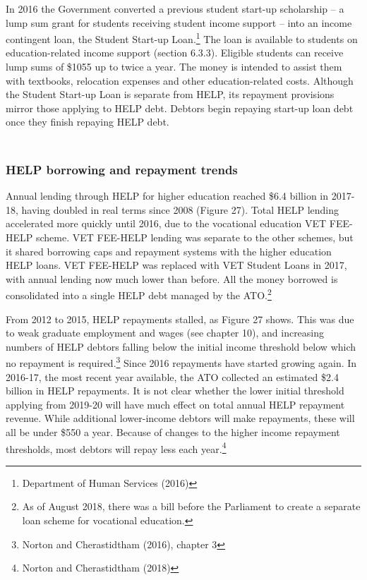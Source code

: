\documentclass[]{book}
\begin{document}
In 2016 the Government converted a previous student start-up scholarship -- a lump sum grant for students receiving student income support -- into an income contingent loan, the Student Start-up Loan.\footnote{Department of Human Services (2016)} The loan is available to students on education-related income support (section 6.3.3). Eligible students can receive lump sums of \$1055 up to twice a year. The money is intended to assist them with textbooks, relocation expenses and other education-related costs. Although the Student Start-up Loan is separate from HELP, its repayment provisions mirror those applying to HELP debt. Debtors begin repaying start-up loan debt once they finish repaying HELP debt.

\hypertarget{help-borrowing-and-repayment-trends}{%
\subsubsection{\texorpdfstring{\\
HELP borrowing and repayment trends }{ HELP borrowing and repayment trends }}\label{help-borrowing-and-repayment-trends}}

Annual lending through HELP for higher education reached \$6.4 billion in 2017-18, having doubled in real terms since 2008 (Figure 27). Total HELP lending accelerated more quickly until 2016, due to the vocational education VET FEE-HELP scheme. VET FEE-HELP lending was separate to the other schemes, but it shared borrowing caps and repayment systems with the higher education HELP loans. VET FEE-HELP was replaced with VET Student Loans in 2017, with annual lending now much lower than before. All the money borrowed is consolidated into a single HELP debt managed by the ATO.\footnote{As of August 2018, there was a bill before the Parliament to create a separate loan scheme for vocational education.}

From 2012 to 2015, HELP repayments stalled, as Figure 27 shows. This was due to weak graduate employment and wages (see chapter 10), and increasing numbers of HELP debtors falling below the initial income threshold below which no repayment is required.\footnote{Norton and Cherastidtham (2016), chapter 3} Since 2016 repayments have started growing again. In 2016-17, the most recent year available, the ATO collected an estimated \$2.4 billion in HELP repayments. It is not clear whether the lower initial threshold applying from 2019-20 will have much effect on total annual HELP repayment revenue. While additional lower-income debtors will make repayments, these will all be under \$550 a year. Because of changes to the higher income repayment thresholds, most debtors will repay less each year.\footnote{Norton and Cherastidtham (2018)}
\end{document}
